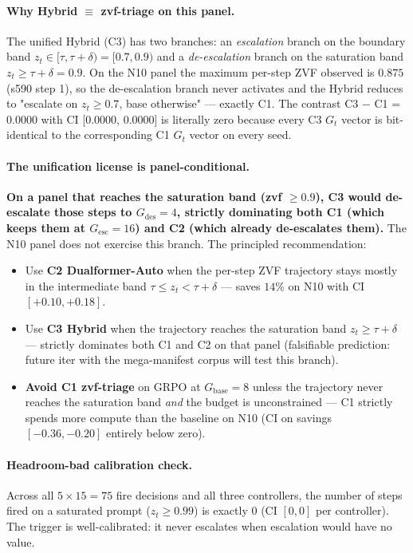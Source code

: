 \paragraph{Why Hybrid $\equiv$ zvf-triage on this panel.}
The unified Hybrid (C3) has two branches: an \emph{escalation} branch
on the boundary band $z_t \in [\tau, \tau{+}\delta) = [0.7, 0.9)$ and a
\emph{de-escalation} branch on the saturation band $z_t \geq \tau{+}\delta = 0.9$.
On the N10 panel the maximum per-step ZVF observed is $0.875$ (s590
step 1), so the de-escalation branch never activates and the Hybrid
reduces to "escalate on $z_t \geq 0.7$, base otherwise" --- exactly C1.
The contrast C3 $-$ C1 = $0.0000$ with CI [$0.0000$, $0.0000$] is
literally zero because every C3 $G_t$ vector is bit-identical to the
corresponding C1 $G_t$ vector on every seed.

\paragraph{The unification license is panel-conditional.}
\textbf{On a panel that reaches the saturation band (zvf $\geq 0.9$), C3 would de-escalate those steps to $G_{\mathrm{des}}{=}4$, strictly dominating both C1 (which keeps them at $G_{\mathrm{esc}}{=}16$) and C2 (which already de-escalates them).} The N10 panel does not exercise this branch. The principled recommendation:
\begin{itemize}
\item Use \textbf{C2 Dualformer-Auto} when the per-step ZVF trajectory
stays mostly in the intermediate band $\tau \leq z_t < \tau{+}\delta$ ---
saves $14\%$ on N10 with CI $[+0.10, +0.18]$.
\item Use \textbf{C3 Hybrid} when the trajectory reaches the saturation
band $z_t \geq \tau{+}\delta$ --- strictly dominates both C1 and C2 on
that panel (falsifiable prediction: future iter with the
mega-manifest corpus will test this branch).
\item \textbf{Avoid C1 zvf-triage} on GRPO at $G_{\mathrm{base}}{=}8$
unless the trajectory never reaches the saturation band \emph{and}
the budget is unconstrained --- C1 strictly spends more compute than
the baseline on N10 (CI on savings $[-0.36, -0.20]$ entirely below zero).
\end{itemize}

\paragraph{Headroom-bad calibration check.}
Across all $5 \times 15 = 75$ fire decisions and all three controllers,
the number of steps fired on a saturated prompt ($z_t \geq 0.99$) is
exactly $0$ (CI $[0, 0]$ per controller). The trigger is well-calibrated:
it never escalates when escalation would have no value.

